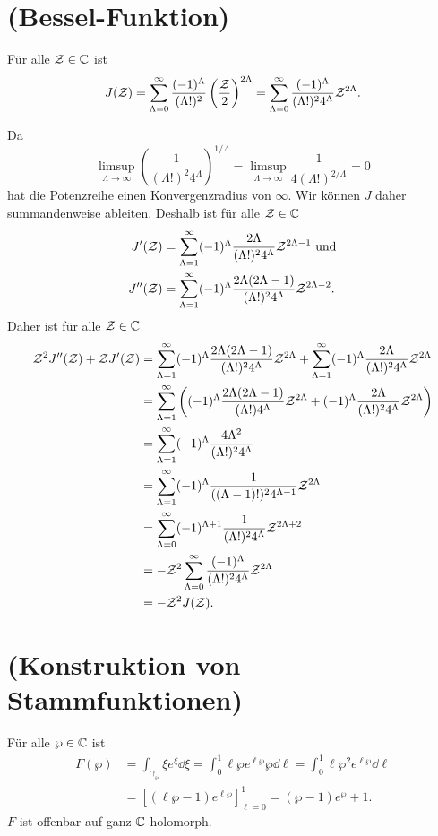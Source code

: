 \documentclass[a4paper,10pt]{article}
\begin{document}
\section{(Bessel-Funktion)}
Für alle $\mathcal{Z} \in \mathbb{C}$ ist
\[
 J(\mathcal{Z})
 = \sum_{\Lambda=0}^\infty \frac{(-1)^\Lambda}{(\Lambda!)^2} \left( \frac{\mathcal{Z}}{2} \right)^{2\Lambda}
 = \sum_{\Lambda=0}^\infty \frac{(-1)^\Lambda}{(\Lambda!)^2 4^\Lambda} \mathcal{Z}^{2\Lambda}.
\]

Da
\[
 \limsup_{\Lambda \to \infty} \left( \frac{1}{(\Lambda!)^2 4^\Lambda} \right)^{1/\Lambda} = \limsup_{\Lambda \to \infty} \frac{1}{4 (\Lambda!)^{2/\Lambda}} = 0
\]
hat die Potenzreihe einen Konvergenzradius von $\infty$. Wir können $J$ daher summandenweise ableiten. Deshalb ist für alle $\mathcal{Z} \in \mathbb{C}$
\begin{align*}
  J'(\mathcal{Z}) &= \sum_{\Lambda=1}^\infty (-1)^\Lambda \frac{2\Lambda}{(\Lambda!)^2 4^\Lambda}{\mathcal{Z}^{2\Lambda-1}} \text{ und} \\
 J''(\mathcal{Z}) &= \sum_{\Lambda=1}^\infty (-1)^\Lambda \frac{2\Lambda (2\Lambda-1)}{(\Lambda!)^2 4^\Lambda} \mathcal{Z}^{2\Lambda-2}.
\end{align*}
Daher ist für alle $\mathcal{Z} \in \mathbb{C}$
\begin{align*}
 \mathcal{Z}^2 J''(\mathcal{Z}) + \mathcal{Z} J'(\mathcal{Z})
 &= \sum_{\Lambda=1}^\infty (-1)^\Lambda \frac{2\Lambda(2\Lambda-1)}{(\Lambda!)^2 4^\Lambda} \mathcal{Z}^{2\Lambda} + \sum_{\Lambda=1}^\infty (-1)^\Lambda \frac{2\Lambda}{(\Lambda!)^2 4^\Lambda} \mathcal{Z}^{2\Lambda} \\
 &= \sum_{\Lambda=1}^\infty \left( (-1)^\Lambda \frac{2\Lambda(2\Lambda-1)}{(\Lambda!)4^\Lambda} \mathcal{Z}^{2\Lambda} + (-1)^\Lambda \frac{2\Lambda}{(\Lambda!)^2 4^\Lambda} \mathcal{Z}^{2\Lambda} \right) \\
 &= \sum_{\Lambda=1}^\infty (-1)^\Lambda \frac{4\Lambda^2}{(\Lambda!)^2 4^\Lambda} \\
 &= \sum_{\Lambda=1}^\infty (-1)^\Lambda \frac{1}{((\Lambda-1)!)^2 4^{\Lambda-1}} \mathcal{Z}^{2\Lambda} \\
 &= \sum_{\Lambda=0}^\infty (-1)^{\Lambda+1} \frac{1}{(\Lambda!)^2 4^\Lambda} \mathcal{Z}^{2\Lambda+2} \\
 &= -\mathcal{Z}^2 \sum_{\Lambda=0}^\infty \frac{(-1)^\Lambda}{(\Lambda!)^2 4^\Lambda} \mathcal{Z}^{2\Lambda} \\
 &= -\mathcal{Z}^2 J(\mathcal{Z}).
\end{align*}






\section{(Konstruktion von Stammfunktionen)}
Für alle $\wp \in \mathbb{C}$ ist
\begin{align*}
 F(\wp)
 &= \int_{\gamma_\wp} \xi e^{\xi} \dd{\xi}
 = \int_0^1 \ell \wp e^{\ell \wp} \wp \dd{\ell}
 = \int_0^1 \ell \wp^2 e^{\ell \wp} \dd{\ell} \\
 &= \left[ (\ell \wp-1) e^{\ell \wp} \right]_{\ell=0}^1
 = (\wp-1)e^\wp + 1.
\end{align*}
$F$ ist offenbar auf ganz $\mathbb{C}$ holomorph.
\end{document}
